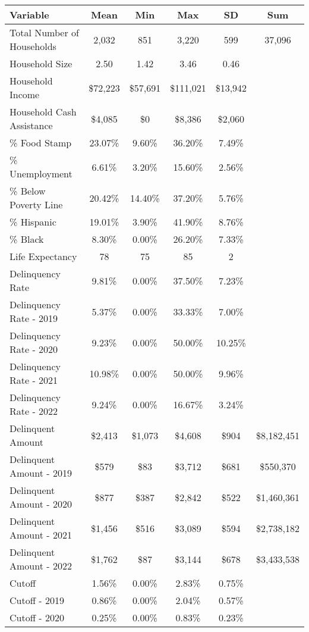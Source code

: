 \begin{tabular}{l|c|c|c|c|c}
\toprule 
\midrule 
Variable & Mean & Min & Max & SD & Sum \\
\midrule 
Total Number of Households & 2,032 & 851 & 3,220 & 599 & 37,096 \\
\quad Household Size & 2.50 & 1.42 & 3.46 & 0.46 \\
Household Income & \$72,223 & \$57,691 & \$111,021 & \$13,942 \\
\quad Household Cash Assistance & \$4,085 & \$0 & \$8,386 & \$2,060 \\
\% Food Stamp & 23.07\% & 9.60\% & 36.20\% & 7.49\% \\
\% Unemployment & 6.61\% & 3.20\% & 15.60\% & 2.56\% \\
\% Below Poverty Line & 20.42\% & 14.40\% & 37.20\% & 5.76\% \\
\% Hispanic & 19.01\% & 3.90\% & 41.90\% & 8.76\% \\
\% Black & 8.30\% & 0.00\% & 26.20\% & 7.33\% \\
Life Expectancy & 78 & 75 & 85 & 2 \\
\midrule 
Delinquency Rate & 9.81\% & 0.00\% & 37.50\% & 7.23\% \\
\quad Delinquency Rate - 2019 & 5.37\% & 0.00\% & 33.33\% & 7.00\% \\
\quad Delinquency Rate - 2020 & 9.23\% & 0.00\% & 50.00\% & 10.25\% \\
\quad Delinquency Rate - 2021 & 10.98\% & 0.00\% & 50.00\% & 9.96\% \\
\quad Delinquency Rate - 2022 & 9.24\% & 0.00\% & 16.67\% & 3.24\% \\
\midrule 
Delinquent Amount & \$2,413 & \$1,073 & \$4,608 & \$904 & \$8,182,451 \\
\quad Delinquent Amount - 2019 & \$579 & \$83 & \$3,712 & \$681 & \$550,370 \\
\quad Delinquent Amount - 2020 & \$877 & \$387 & \$2,842 & \$522 & \$1,460,361 \\
\quad Delinquent Amount - 2021 & \$1,456 & \$516 & \$3,089 & \$594 & \$2,738,182 \\
\quad Delinquent Amount - 2022 & \$1,762 & \$87 & \$3,144 & \$678 & \$3,433,538 \\
\midrule 
Cutoff & 1.56\% & 0.00\% & 2.83\% & 0.75\% \\
\quad Cutoff - 2019 & 0.86\% & 0.00\% & 2.04\% & 0.57\% \\
\quad Cutoff - 2020 & 0.25\% & 0.00\% & 0.83\% & 0.23\% \\

\end{tabular}
